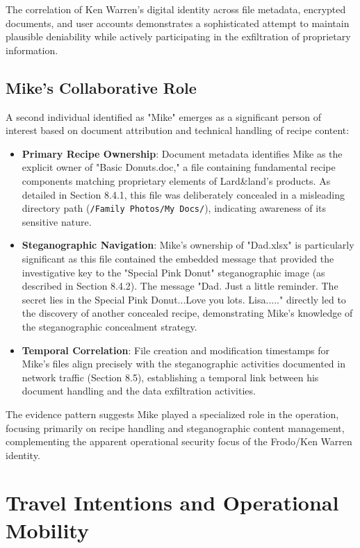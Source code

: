 The correlation of Ken Warren's digital identity across file metadata, encrypted documents, and user accounts demonstrates a sophisticated attempt to maintain plausible deniability while actively participating in the exfiltration of proprietary information.

\subsection{Mike's Collaborative Role}
A second individual identified as "Mike" emerges as a significant person of interest based on document attribution and technical handling of recipe content:

\begin{itemize}
    \item \textbf{Primary Recipe Ownership}: Document metadata identifies Mike as the explicit owner of "Basic Donuts.doc," a file containing fundamental recipe components matching proprietary elements of Lard\&land's products. As detailed in Section 8.4.1, this file was deliberately concealed in a misleading directory path (\texttt{/Family Photos/My Docs/}), indicating awareness of its sensitive nature.
    
    \item \textbf{Steganographic Navigation}: Mike's ownership of "Dad.xlsx" is particularly significant as this file contained the embedded message that provided the investigative key to the "Special Pink Donut" steganographic image (as described in Section 8.4.2). The message "Dad. Just a little reminder. The secret lies in the Special Pink Donut...Love you lots. Lisa....." directly led to the discovery of another concealed recipe, demonstrating Mike's knowledge of the steganographic concealment strategy.
    
    \item \textbf{Temporal Correlation}: File creation and modification timestamps for Mike's files align precisely with the steganographic activities documented in network traffic (Section 8.5), establishing a temporal link between his document handling and the data exfiltration activities.
\end{itemize}

The evidence pattern suggests Mike played a specialized role in the operation, focusing primarily on recipe handling and steganographic content management, complementing the apparent operational security focus of the Frodo/Ken Warren identity.

\section{Travel Intentions and Operational Mobility}
